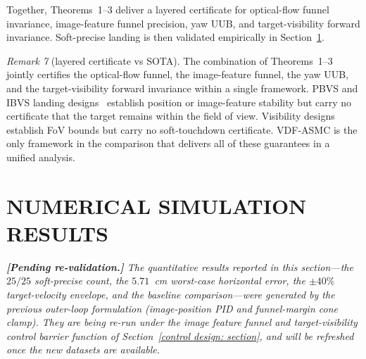 \documentclass{IEEEtaes}
\begin{document}
Together, Theorems~1--3 deliver a layered certificate for optical-flow funnel invariance, image-feature funnel precision, yaw UUB, and target-visibility forward invariance. Soft-precise landing is then validated empirically in Section~\ref{experimentation: section}.

\textit{Remark 7} (layered certificate vs SOTA). The combination of Theorems~1--3 jointly certifies the optical-flow funnel, the image-feature funnel, the yaw UUB, and the target-visibility forward invariance within a single framework. PBVS and IBVS landing designs~\cite{lin2022, zhang2026, cho2022, lin2023} establish position or image-feature stability but carry no certificate that the target remains within the field of view. Visibility designs~\cite{salehi2021, xie2016} establish FoV bounds but carry no soft-touchdown certificate. VDF-ASMC is the only framework in the comparison that delivers all of these guarantees in a unified analysis.


\section{NUMERICAL SIMULATION RESULTS}
\label{experimentation: section}
\textit{\textbf{[Pending re-validation.]} The quantitative results reported in this section---the $25/25$ soft-precise count, the $5.71$~cm worst-case horizontal error, the $\pm 40\%$ target-velocity envelope, and the baseline comparison---were generated by the previous outer-loop formulation (image-position PID and funnel-margin cone clamp). They are being re-run under the image feature funnel and target-visibility control barrier function of Section~\ref{control design: section}, and will be refreshed once the new datasets are available.}
\end{document}

